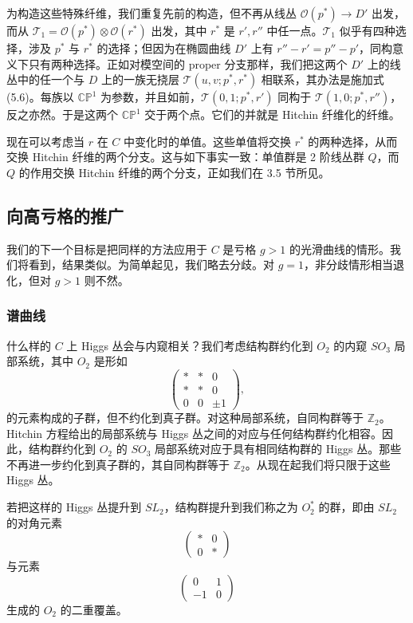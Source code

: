 \documentclass[11pt,a4paper]{article}
\begin{document}
为构造这些特殊纤维，我们重复先前的构造，但不再从线丛 $\mathcal{O}(p^*)\to D'$ 出发，而从 $\mathcal{T}_1 = \mathcal{O}(p^*)\otimes\mathcal{O}(r^*)$ 出发，其中 $r^*$ 是 $r',r''$ 中任一点。$\mathcal{T}_1$ 似乎有四种选择，涉及 $p^*$ 与 $r^*$ 的选择；但因为在椭圆曲线 $D'$ 上有 $r''-r' = p''-p'$，同构意义下只有两种选择。正如对模空间的 proper 分支那样，我们把这两个 $D'$ 上的线丛中的任一个与 $D$ 上的一族无挠层 $\mathcal{T}(u,v;p^*,r^*)$ 相联系，其办法是施加式 (5.6)。每族以 $\mathbb{CP}^1$ 为参数，并且如前，$\mathcal{T}(0,1;p^*,r')$ 同构于 $\mathcal{T}(1,0;p^*,r'')$，反之亦然。于是这两个 $\mathbb{CP}^1$ 交于两个点。它们的并就是 Hitchin 纤维化的纤维。

现在可以考虑当 $r$ 在 $C$ 中变化时的单值。这些单值将交换 $r^*$ 的两种选择，从而交换 Hitchin 纤维的两个分支。这与如下事实一致：单值群是 2 阶线丛群 $Q$，而 $Q$ 的作用交换 Hitchin 纤维的两个分支，正如我们在 3.5 节所见。

\subsection{向高亏格的推广}

我们的下一个目标是把同样的方法应用于 $C$ 是亏格 $g>1$ 的光滑曲线的情形。我们将看到，结果类似。为简单起见，我们略去分歧。对 $g=1$，非分歧情形相当退化，但对 $g>1$ 则不然。

\subsubsection{谱曲线}

什么样的 $C$ 上 Higgs 丛会与内窥相关？我们考虑结构群约化到 $O_2$ 的内窥 $SO_3$ 局部系统，其中 $O_2$ 是形如
\begin{equation}\tag{5.7}
\begin{pmatrix}
* & * & 0\\
* & * & 0\\
0 & 0 & \pm 1
\end{pmatrix},
\end{equation}
的元素构成的子群，但不约化到真子群。对这种局部系统，自同构群等于 $\mathbb{Z}_2$。Hitchin 方程给出的局部系统与 Higgs 丛之间的对应与任何结构群约化相容。因此，结构群约化到 $O_2$ 的 $SO_3$ 局部系统对应于具有相同结构群的 Higgs 丛。那些不再进一步约化到真子群的，其自同构群等于 $\mathbb{Z}_2$。从现在起我们将只限于这些 Higgs 丛。


若把这样的 Higgs 丛提升到 $SL_2$，结构群提升到我们称之为 $O_2^*$ 的群，即由 $SL_2$ 的对角元素
\begin{equation}\tag{5.8}
\begin{pmatrix}
* & 0\\
0 & *
\end{pmatrix}
\end{equation}
与元素
\begin{equation}\tag{5.9}
\begin{pmatrix}
0 & 1\\
-1 & 0
\end{pmatrix}
\end{equation}
生成的 $O_2$ 的二重覆盖。
\end{document}
